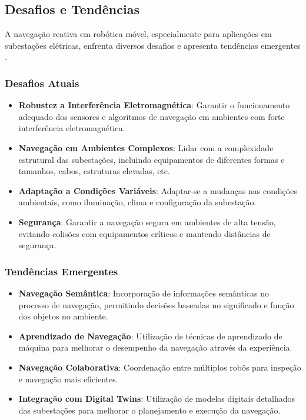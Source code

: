 \subsection{Desafios e Tendências}

A navegação reativa em robótica móvel, especialmente para aplicações em subestações elétricas, enfrenta diversos desafios e apresenta tendências emergentes \cite{Cadena2016, Lactec2022, Iberdrola2022}.

\subsubsection{Desafios Atuais}

\begin{itemize}
    \item \textbf{Robustez a Interferência Eletromagnética}: Garantir o funcionamento adequado dos sensores e algoritmos de navegação em ambientes com forte interferência eletromagnética.
    
    \item \textbf{Navegação em Ambientes Complexos}: Lidar com a complexidade estrutural das subestações, incluindo equipamentos de diferentes formas e tamanhos, cabos, estruturas elevadas, etc.
    
    \item \textbf{Adaptação a Condições Variáveis}: Adaptar-se a mudanças nas condições ambientais, como iluminação, clima e configuração da subestação.
    
    \item \textbf{Segurança}: Garantir a navegação segura em ambientes de alta tensão, evitando colisões com equipamentos críticos e mantendo distâncias de segurança.
\end{itemize}

\subsubsection{Tendências Emergentes}

\begin{itemize}
    \item \textbf{Navegação Semântica}: Incorporação de informações semânticas no processo de navegação, permitindo decisões baseadas no significado e função dos objetos no ambiente.
    
    \item \textbf{Aprendizado de Navegação}: Utilização de técnicas de aprendizado de máquina para melhorar o desempenho da navegação através da experiência.
    
    \item \textbf{Navegação Colaborativa}: Coordenação entre múltiplos robôs para inspeção e navegação mais eficientes.
    
    \item \textbf{Integração com Digital Twins}: Utilização de modelos digitais detalhados das subestações para melhorar o planejamento e execução da navegação.
\end{itemize}

